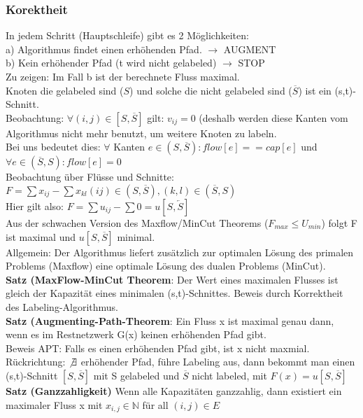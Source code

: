 \documentclass[a4paper]{article}
\begin{document}
\subsubsection*{Korektheit}
In jedem Schritt (Hauptschleife) gibt es 2 Möglichkeiten:\\
a) Algorithmus findet einen erhöhenden Pfad. $\rightarrow$ AUGMENT\\
b) Kein erhöhender Pfad (t wird nicht gelabeled) $\rightarrow$ STOP\\
Zu zeigen: Im Fall b ist der berechnete Fluss maximal.\\
Knoten die gelabeled sind ($S$) und solche die nicht gelabeled sind ($\overline{S}$) ist ein (s,t)-Schnitt.\\
Beobachtung: $\forall (i,j)\in [S,\overline{S}]$ gilt: $v_{ij}=0$ (deshalb werden diese Kanten vom Algorithmus nicht mehr benutzt, um weitere Knoten zu labeln.\\
Bei uns bedeutet dies: $\forall$ Kanten $e \in (S,\overline{S}):flow[e]==cap[e]$ und $\forall e\in (\overline{S},S): flow[e]=0$\\
Beobachtung über Flüsse und Schnitte: $F=\sum x_{ij} - \sum x_{kl} (ij)\in (S,\overline{S}), (k,l)\in (\overline{S},S)$\\
Hier gilt also: $F=\sum u_{ij} - \sum 0 = u[S,\overleftarrow{S}]$\\
Aus der schwachen Version des Maxflow/MinCut Theorems ($F_{max} \leq U_{min}$) folgt F ist maximal und $u[S,\overline{S}]$ minimal.\\
Allgemein: Der Algorithmus liefert zusätzlich zur optimalen Lösung des primalen Problems (Maxflow) eine optimale Lösung des dualen Problems (MinCut).\\
\textbf{Satz (MaxFlow-MinCut Theorem}: Der Wert eines maximalen Flusses ist gleich der Kapazität eines minimalen (s,t)-Schnittes. Beweis durch Korrektheit des Labeling-Algorithmus.\\
\textbf{Satz (Augmenting-Path-Theorem}: Ein Fluss x ist maximal genau dann, wenn es im Restnetzwerk G(x) keinen erhöhenden Pfad gibt.\\
Beweis APT: Falls es einen erhöhenden Pfad gibt, ist x nicht maxmial. Rückrichtung: $\not\exists$ erhöhender Pfad, führe Labeling aus, dann bekommt man einen (s,t)-Schnitt $[S,\overline{S}]$ mit S gelabeled und $\overline{S}$ nicht labeled, mit $F(x)=u[S,\overline{S}]$\\
\textbf{Satz (Ganzzahligkeit)}
Wenn alle Kapazitäten ganzzahlig, dann existiert ein maximaler Fluss x mit $x_{i,j}\in \mathbb{N}$ für all $(i,j)\in E$\\
\end{document}
